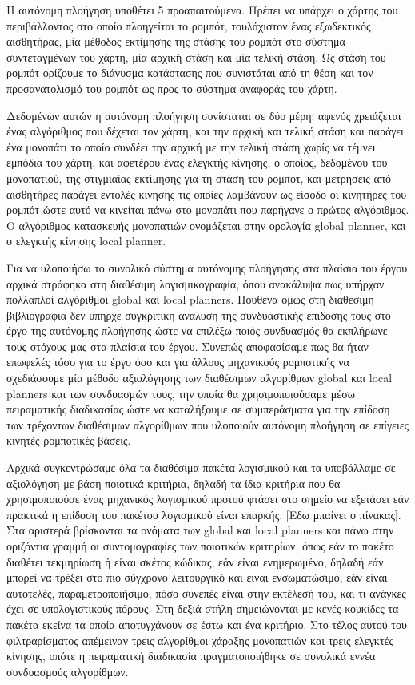 \documentclass[a4paper,10pt]{article}
\begin{document}
Η αυτόνομη πλοήγηση υποθέτει 5
προαπαιτούμενα.  Πρέπει να υπάρχει ο χάρτης του περιβάλλοντος στο οποίο
πλοηγείται το ρομπότ, τουλάχιστον ένας εξωδεκτικός αισθητήρας, μία μέθοδος
εκτίμησης της στάσης του ρομπότ στο σύστημα συντεταγμένων του χάρτη, μία αρχική
στάση και μία τελική στάση. Ως στάση του ρομπότ ορίζουμε το διάνυσμα κατάστασης
που συνιστάται από τη θέση και τον προσανατολισμό του ρομπότ ως προς το σύστημα
αναφοράς του χάρτη.

Δεδομένων αυτών η αυτόνομη πλοήγηση συνίσταται σε δύο
μέρη: αφενός χρειάζεται ένας αλγόριθμος που δέχεται τον χάρτη, και την αρχική
και τελική στάση και παράγει ένα μονοπάτι το οποίο συνδέει την αρχική με την
τελική στάση χωρίς να τέμνει εμπόδια του χάρτη, και αφετέρου ένας ελεγκτής
κίνησης, ο οποίος, δεδομένου του μονοπατιού, της στιγμιαίας εκτίμησης για τη
στάση του ρομπότ, και μετρήσεις από αισθητήρες παράγει εντολές κίνησης τις
οποίες λαμβάνουν ως είσοδο οι κινητήρες του ρομπότ ώστε αυτό να κινείται πάνω
στο μονοπάτι που παρήγαγε ο πρώτος αλγόριθμος. Ο αλγόριθμος κατασκευής
μονοπατιών ονομάζεται στην ορολογία global planner, και ο ελεγκτής κίνησης
local planner.

Για να υλοποιήσω το συνολικό σύστημα αυτόνομης πλοήγησης στα πλαίσια του έργου
αρχικά στράφηκα στη διαθέσιμη λογισμικογραφία, όπου ανακάλυψα πως υπήρχαν
πολλαπλοί αλγόριθμοι global και local planners. Πουθενα ομως στη διαθεσιμη
βιβλιογραφια δεν υπηρχε συγκριτικη αναλυση της συνδυαστικής επιδοσης τους στο
έργο της αυτόνομης πλοήγησης ώστε να επιλέξω ποιός συνδυασμός θα εκπλήρωνε τους
στόχους μας στα πλαίσια του έργου. Συνεπώς αποφασίσαμε πως θα ήταν επωφελές
τόσο για το έργο όσο και για άλλους μηχανικούς ρομποτικής να σχεδιάσουμε μία
μέθοδο αξιολόγησης των διαθέσιμων αλγορίθμων global και local planners και των
συνδυασμών τους, την οποία θα χρησιμοποιούσαμε μέσω πειραματικής διαδικασίας
ώστε να καταλήξουμε σε συμπεράσματα για την επίδοση των τρέχοντων διαθέσιμων
αλγορίθμων που υλοποιούν αυτόνομη πλοήγηση σε επίγειες κινητές ρομποτικές
βάσεις.

Αρχικά συγκεντρώσαμε όλα τα διαθέσιμα πακέτα λογισμικού και τα υποβάλλαμε σε
αξιολόγηση με βάση ποιοτικά κριτήρια, δηλαδή τα ίδια κριτήρια που θα
χρησιμοποιούσε ένας μηχανικός λογισμικού προτού φτάσει στο σημείο
να εξετάσει εάν πρακτικά η επίδοση του πακέτου λογισμικού είναι επαρκής.  [Εδω
μπαίνει ο πίνακας]. Στα αριστερά βρίσκονται τα ονόματα των global και local
planners και πάνω στην οριζόντια γραμμή οι συντομογραφίες των ποιοτικών
κριτηρίων, όπως εάν το πακέτο διαθέτει τεκμηρίωση ή είναι σκέτος κώδικας, εάν
είναι ενημερωμένο, δηλαδή εάν μπορεί να τρέξει στο πιο σύγχρονο λειτουργικό και
ειναι ενσωματώσιμο, εάν είναι αυτοτελές, παραμετροποιήσιμο, πόσο συνεπές
είναι στην εκτέλεσή του, και τι ανάγκες έχει σε υπολογιστικούς πόρους. Στη
δεξιά στήλη σημειώνονται με κενές κουκίδες τα πακέτα εκείνα τα οποία
αποτυγχάνουν σε έστω και ένα κριτήριο. Στο τέλος αυτού του φιλτραρίσματος
απέμειναν τρεις αλγορίθμοι χάραξης μονοπατιών και τρεις ελεγκτές κίνησης,
οπότε η πειραματική διαδικασία πραγματοποιήθηκε σε συνολικά εννέα συνδυασμούς
αλγορίθμων.
\end{document}

